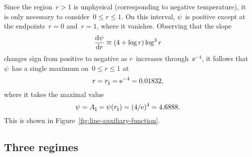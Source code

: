 Since the region~$r > 1$ is unphysical
(corresponding to negative temperature),
it is only necessary to consider~$0 \le r \le 1$.
On this interval, $\psi$~is positive
except at the endpoints~$r = 0$ and~$r = 1$, where it vanishes.
Observing that the slope
\begin{equation}
  \tder{\psi}{r} \ideq (4 + \log r) \log^3 r
  \label{eq:line-psi-r-derivative}
\end{equation}
changes sign from positive to negative
as $r$~increases through~$\ee^{-4}$,
it follows that $\psi$~has a single maximum on~$0 \le r \le 1$ at
\begin{equation}
  r = r_\natural = \mathrm{e}^{-4} = 0.01832,
  \label{eq:line-r-natural}
\end{equation}
where it takes the maximal value
\begin{equation}
  \psi
  = A_\natural
  = \psi (r_\natural)
  = (4 / \mathrm{e})^4
  = 4.6888.
  \label{eq:line-a-natural}
\end{equation}
This is shown in Figure~\ref{fig:line-auxiliary-function}.

\subsection{Three regimes}
\label{sec:polar.viable.regimes}

\begin{figure}
\end{figure}

